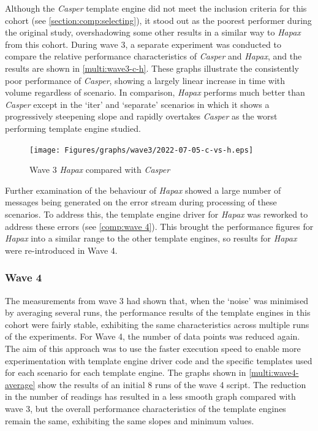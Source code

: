 Although the \emph{Casper} template engine did not meet the inclusion criteria for this cohort (see \autoref{section:comp:selecting}), it stood out as the poorest performer during the original study, overshadowing some other results in a similar way to \emph{Hapax} from this cohort. During wave 3, a separate experiment was conducted to compare the relative performance characteristics of \emph{Casper} and \emph{Hapax}, and the results are shown in \autoref{multi:wave3-c-h}. These graphs illustrate the consistently poor performance of \emph{Casper}, showing a largely linear increase in time with volume regardless of scenario. In comparison, \emph{Hapax} performs much better than \emph{Casper} except in the `iter' and `separate' scenarios in which it shows a progressively steepening slope and rapidly overtakes \emph{Casper} as the worst performing template engine studied.

\begin{figure}[ht!]
\centering
\texttt{[image: Figures/graphs/wave3/2022-07-05-c-vs-h.eps]}
\caption{\label{multi:wave3-c-h}Wave 3 \emph{Hapax} compared with \emph{Casper}}
\end{figure}

Further examination of the behaviour of \emph{Hapax} showed a large number of messages being generated on the error stream during processing of these scenarios. To address this, the template engine driver for \emph{Hapax} was reworked to address these errors (see \autoref{comp:wave 4}). This brought the performance figures for \emph{Hapax} into a similar range to the other template engines, so results for \emph{Hapax} were re-introduced in Wave 4. 


\subsubsection{Wave 4}
\label{comp:wave 4}

The measurements from wave 3 had shown that, when the `noise' was minimised by averaging several runs, the performance results of the template engines in this cohort were fairly stable, exhibiting the same characteristics across multiple runs of the experiments. For Wave 4, the number of data points was reduced again. The aim of this approach was to use the faster execution speed to enable more experimentation with template engine driver code and the specific templates used for each scenario for each template engine. The graphs shown in \autoref{multi:wave4-average} show the results of an initial 8 runs of the wave 4 script. The reduction in the number of readings has resulted in a less smooth graph compared with wave 3, but the overall performance characteristics of the template engines remain the same, exhibiting the same slopes and minimum values.

